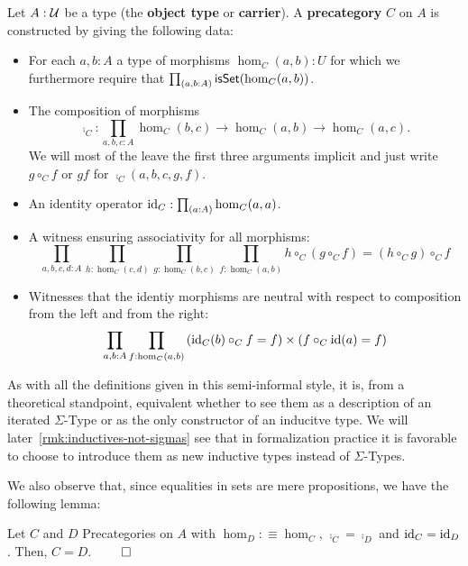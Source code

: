 \begin{defn}[Precategory] \label{def:hott-precat}
Let $A : \mathcal{U}$ be a type (the \textbf{object type} or \textbf{carrier}). A
\textbf{precategory} $C$ on $A$ is constructed by giving the following data:
\begin{itemize}
\item For each $a, b : A$ a type of morphisms $\hom_C(a, b) : U$ for which we furthermore
require that $\prod_{(a,b:A)} \mathsf{isSet}(\hom_C(a, b))$.
\item The composition of morphisms
\begin{equation*}
\comp_C : \prod_{a,b,c:A} \hom_C(b, c) \to \hom_C(a, b) \to \hom_C(a, c) \text{.}
\end{equation*}
We will most of the leave the first three arguments implicit and just write
$g \circ_C f$ or $gf$ for $\comp_C(a,b,c,g,f)$.
\item An identity operator $\operatorname{id}_C : \prod_{(a:A)} \hom_C(a,a)$.
\item A witness ensuring associativity for all morphisms:
\begin{equation*}
\prod_{a,b,c,d:A} \prod_{h:\hom_C(c,d)} \prod_{g:\hom_C(b,c)} \prod_{f:\hom_C(a,b)}
h \circ_C (g \circ_C f) = (h \circ_C g) \circ_C f
\end{equation*}
\item Witnesses that the identiy morphisms are neutral with respect to composition
from the left and from the right:
\begin{equation*}
\prod_{a, b : A} \prod_{f : \hom_C(a, b)}
\left(\operatorname{id}_C(b) \circ_C f = f\right) \times \left(f \circ_C \operatorname{id}(a) = f\right)
\end{equation*}
\end{itemize}
\end{defn}

As with all the definitions given in this semi-informal style, it is, from a
theoretical standpoint, equivalent whether to see them as a description of an
iterated $\Sigma$-Type or as the only constructor of an inducitve type.
We will later~\ref{rmk:inductives-not-sigmas} see that in formalization practice
it is favorable to choose to introduce them as new inductive types instead of
$\Sigma$-Types.

We also observe that, since equalities in sets are mere propositions, we have the
following lemma:
\begin{lemma} \label{thm:hott-eq-precat}
Let $C$ and $D$ Precategories on $A$ with $\hom_D :\equiv \hom_C$, 
$\comp_C = \comp_D$ and $\operatorname{id}_C = \operatorname{id}_D$.
Then, $C = D$. \hfill $\qed$
\end{lemma}


